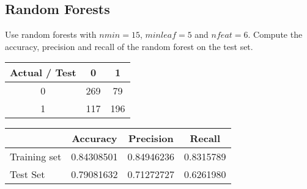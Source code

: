 \documentclass[a4paper,12pt]{article}
\begin{document}
\subsection{Random Forests}
Use random forests with $nmin=15$, $minleaf=5$ and $nfeat=6$.
Compute the accuracy, precision and recall of the random forest on the test set.

\begin{table}[h!]
\centering
	\begin{tabular}{c||c|c}
	Actual / Test & 0 & 1 \\ \hline \hline
	0 & 269 & 79 \\ \hline
	1 & 117 & 196
	\end{tabular}
\end{table}

\begin{table}[h!]
\centering
	\begin{tabular}{l||c|c|c}
	& Accuracy & Precision & Recall \\ \hline \hline
	Training set & 0.84308501 & 0.84946236 & 0.8315789 \\ \hline
	Test Set & 0.79081632 & 0.71272727 & 0.6261980
	\end{tabular}
\end{table}
\end{document}
